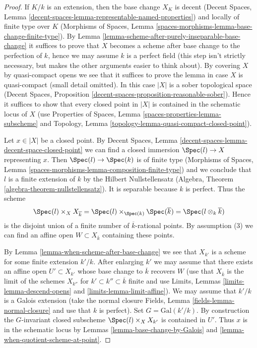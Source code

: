 \begin{proof}
If $K/k$ is an extension, then the base change $X_K$ is
decent (Decent Spaces, Lemma
\ref{decent-spaces-lemma-representable-named-properties})
and locally of finite type
over $K$ (Morphisms of Spaces, Lemma
\ref{spaces-morphisms-lemma-base-change-finite-type}).
By Lemma \ref{lemma-scheme-after-purely-inseparable-base-change}
it suffices to prove that $X$ becomes a scheme after base change to
the perfection of $k$, hence we may assume $k$ is a perfect field
(this step isn't strictly necessary, but makes the other arguments
easier to think about).
By covering $X$ by quasi-compact opens we see that it suffices to prove
the lemma in case $X$ is quasi-compact (small detail omitted).
In this case $|X|$ is a sober topological space
(Decent Spaces, Proposition
\ref{decent-spaces-proposition-reasonable-sober}).
Hence it suffices to show that every closed point in $|X|$
is contained in the schematic locus of $X$
(use Properties of Spaces, Lemma \ref{spaces-properties-lemma-subscheme} and
Topology, Lemma \ref{topology-lemma-quasi-compact-closed-point}).

\medskip\noindent
Let $x \in |X|$ be a closed point. By Decent Spaces, Lemma
\ref{decent-spaces-lemma-decent-space-closed-point}
we can find a closed immersion $\Spec(l) \to X$ representing $x$.
Then $\Spec(l) \to \Spec(k)$ is of finite type (Morphisms of Spaces,
Lemma \ref{spaces-morphisms-lemma-composition-finite-type}) and we
conclude that $l$ is a finite extension of $k$
by the Hilbert Nullstellensatz (Algebra, Theorem
\ref{algebra-theorem-nullstellensatz}). It is separable because
$k$ is perfect. Thus the scheme
$$
\Spec(l) \times_X X_{\overline{k}} =
\Spec(l) \times_{\Spec(k)} \Spec(\overline{k}) =
\Spec(l \otimes_k \overline{k})
$$
is the disjoint union of a finite number of $\overline{k}$-rational points.
By assumption (3) we can find an affine open $W \subset X_{\overline{k}}$
containing these points.

\medskip\noindent
By Lemma \ref{lemma-when-scheme-after-base-change} we see that $X_{k'}$
is a scheme for some finite extension $k'/k$. After enlarging
$k'$ we may assume that there exists an affine open $U' \subset X_{k'}$
whose base change to $\overline{k}$ recovers $W$
(use that $X_{\overline{k}}$ is the limit of the schemes $X_{k''}$
for $k' \subset k'' \subset \overline{k}$ finite and use
Limits, Lemmas \ref{limits-lemma-descend-opens} and
\ref{limits-lemma-limit-affine}). We may assume
that $k'/k$ is a Galois extension (take the normal closure
Fields, Lemma \ref{fields-lemma-normal-closure} and use
that $k$ is perfect). Set $G = \text{Gal}(k'/k)$.
By construction the $G$-invariant closed subscheme
$\Spec(l) \times_X X_{k'}$ is contained in $U'$.
Thus $x$ is in the schematic locus by
Lemmas \ref{lemma-base-change-by-Galois} and
\ref{lemma-when-quotient-scheme-at-point}.
\end{proof}

